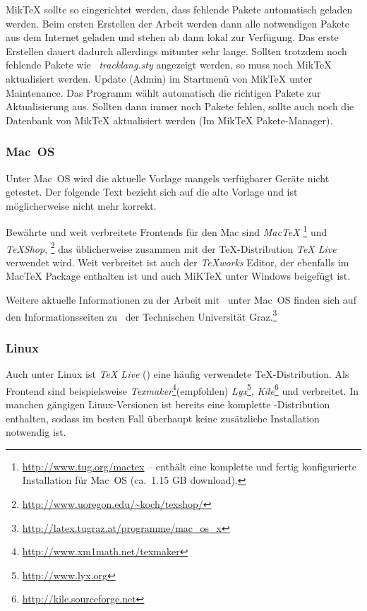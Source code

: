 MikTeX sollte so eingerichtet werden, dass fehlende Pakete automatisch geladen werden. Beim ersten Erstellen der Arbeit werden dann alle notwendigen Pakete aus dem Internet geladen und stehen ab dann lokal zur Verfügung. Das erste Erstellen dauert dadurch allerdings mitunter sehr lange. Sollten trotzdem noch fehlende Pakete wie \zB\ \emph{tracklang.sty} angezeigt werden, so muss noch MikTeX aktualisiert werden. Update (Admin) im Startmenü von MikTeX unter Maintenance. Das Programm wählt automatisch die richtigen Pakete zur Aktualisierung aus. Sollten dann immer noch Pakete fehlen, sollte auch noch die Datenbank von MikTeX aktualisiert werden (Im MikTeX Pakete-Manager).

\subsubsection{Mac~OS}

Unter Mac~OS wird die aktuelle Vorlage mangels verfügbarer Geräte nicht getestet. Der folgende Text bezieht sich auf die alte Vorlage und ist möglicherweise nicht mehr korrekt.

Bewährte und weit verbreitete Frontends für den Mac sind \emph{MacTeX}%
\footnote{\url{http://www.tug.org/mactex} -- enthält eine komplette und fertig
konfigurierte \latex\-Installation für Mac~OS (ca.\ 1.15 GB download).}
und \emph{TeXShop},%
\footnote{\url{http://www.uoregon.edu/~koch/texshop/}}
das üblicherweise zusammen mit der TeX-Distribution \emph{TeX Live} verwendet wird. 
Weit verbreitet ist auch der \emph{TeXworks} Editor, der ebenfalls im MacTeX Package enthalten ist und auch MiKTeX unter Windows beigefügt ist.

Weitere aktuelle Informationen zu der Arbeit mit \latex\ unter Mac~OS finden sich auf den Informationsseiten zu \latex\ der Technischen Universität Graz.\footnote{\url{http://latex.tugraz.at/programme/mac_os_x}}

\subsubsection{Linux}

Auch unter \gls{Linux} ist \emph{TeX Live} (\so) eine häufig verwendete TeX-Distri\-bution. 
Als Frontend sind beispielsweise
\emph{Texmaker}\footnote{\url{http://www.xm1math.net/texmaker}}(empfohlen) \emph{Lyx}\footnote{\url{http://www.lyx.org}},
\emph{Kile}\footnote{\url{http://kile.sourceforge.net}} und
verbreitet.
In manchen gängigen Linux-Versionen ist bereits eine komplette \latex-Distribution enthalten, sodass im besten Fall überhaupt keine zusätzliche Installation notwendig ist.  


